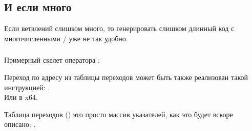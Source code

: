 \subsection{И если много}

Если ветвлений слишком много, то генерировать слишком длинный код с многочисленными \JE/\JNE 
уже не так удобно.







\subsubsection{\Conclusion{}}

Примерный скелет оператора :



Переход по адресу из таблицы переходов может быть также реализован такой инструкцией: .\\
Или  в x64.

Таблица переходов () это просто массив указателей, как это будет вскоре описано: .
